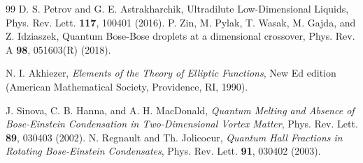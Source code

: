 \documentclass[reprint,aps,prl,twocolumn,superscriptaddress]{revtex4-1}
\begin{document}
\begin{thebibliography}{99}
D. S. Petrov and G. E. Astrakharchik, Ultradilute Low-Dimensional Liquids,  Phys. Rev. Lett. {\bf 117}, 100401 (2016).
P. Zin, M. Pylak, T. Wasak, M. Gajda, and Z. Idziaszek, Quantum Bose-Bose droplets at a dimensional crossover, Phys. Rev. A {\bf 98}, 051603(R) (2018).

     N. I. Akhiezer, \textit{Elements of the Theory of Elliptic Functions}, New Ed edition (American Mathematical Society, Providence, RI, 1990).




     J. Sinova, C. B. Hanna, and A. H. MacDonald, \textit{Quantum Melting and Absence of Bose-Einstein Condensation in Two-Dimensional Vortex Matter}, %
    {Phys. Rev. Lett. {\bf 89}, 030403 (2002)}.
     N. Regnault and Th. Jolicoeur, \textit{Quantum Hall Fractions in Rotating Bose-Einstein Condensates}, %
    {Phys. Rev. Lett. {\bf 91}, 030402 (2003)}.
    


\end{thebibliography}
\end{document}
